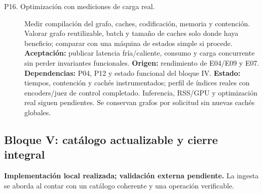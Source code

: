 \begin{description}
\item[P16. Optimización con mediciones de carga real.]
Medir compilación del grafo, caches, codificación, memoria y contención.
Valorar grafo reutilizable, batch y tamaño de caches solo donde haya beneficio;
comparar con una máquina de estados simple si procede.
\textbf{Aceptación:} publicar latencia fría/caliente, consumo y carga concurrente
sin perder invariantes funcionales.
\textbf{Origen:} rendimiento de E04/E09 y E07.
\textbf{Dependencias:} P04, P12 y estado funcional del bloque IV.
\textbf{Estado:} tiempos, contención y cachés instrumentados; perfil de índices
reales con encoders/juez de control completado. Inferencia, RSS/GPU y optimización
real siguen pendientes. Se conservan grafos por solicitud sin nuevas cachés globales.
\end{description}

\subsection{Bloque V: catálogo actualizable y cierre integral}
\textbf{Implementación local realizada; validación externa pendiente.} La ingesta se aborda al contar
con un catálogo coherente y una operación verificable.

